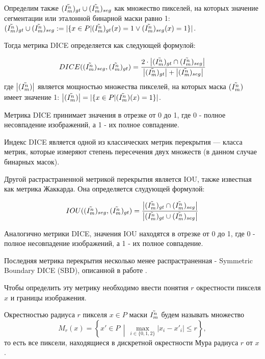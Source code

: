 Определим также \((\tilde{I^n_m})_{gt} \cup (\tilde{I^n_m})_{seg}\) как множество пикселей, на которых значение сегментации или эталонной бинарной маски  равно 1: \((\tilde{I^n_m})_{gt} \cup (\tilde{I^n_m})_{seg} := |\{x \in P | (\tilde{I^n_m})_{gt}(x) = 1 \lor (\tilde{I^n_m})_{seg}(x) = 1 \}|\).

Тогда метрика DICE определяется как следующей формулой:

\begin{equation}\label{eq:DICE}
    DICE((\tilde{I^n_m})_{seg}, (\tilde{I^n_m})_{gt}) =
    \frac{2 \cdot \left|(\tilde{I^n_m})_{gt} \cap (\tilde{I^n_m})_{seg}\right|}
         {\left|(\tilde{I^n_m})_{gt}\right| + \left|(\tilde{I^n_m})_{seg}\right|}
\end{equation}
где \(\left|(\tilde{I^n_m})\right|\) является мощностью множества пикселей, на которых  маска \((\tilde{I^n_m})\) имеет значение 1: \(\left|(\tilde{I^n_m})\right| = |\{x \in P | (\tilde{I^n_m})(x) = 1 \}|\).

Метрика DICE принимает значения в отрезке от 0 до 1, где 0 - полное несовпадение изображений, а 1 - их полное совпадение.

Индекс DICE является одной из классических метрик перекрытия — класса метрик, которые измеряют степень пересечения двух множеств (в данном случае бинарных масок). 

Другой растрастраненной метрикой перекрытия является IOU, также известная как метрика Жаккарда. Она определяется слудующей формулой:

\begin{equation}\label{eq:IOU}
    IOU((\tilde{I^n_m})_{seg}, (\tilde{I^n_m})_{gt}) =
    \frac{\left|(\tilde{I^n_m})_{gt} \cap (\tilde{I^n_m})_{seg}\right|}
         {\left|(\tilde{I^n_m})_{gt} \cup (\tilde{I^n_m})_{seg}\right|}
\end{equation}

Аналогично метрики DICE, значения IOU находятся в отрезке от 0 до 1, где 0 - полное несовпадение изображений, а 1 - их полное совпадение.

Последняя метрика перекрытия несколько менее распрастраненная - Symmetric Boundary DICE (SBD), описанной в работе \cite{yeghiazaryan2018family}.

Чтобы определить эту метрику необходимо ввести понятия \(r\) окрестности пикселя \(x\) и границы изображения.

Окрестностью радиуса \(r\) пикселя \(x \in P\) маски \(\tilde{I^n_m}\) будем называть множество
\begin{equation}\label{eq:neighborhood}
    M_r(x) = \left\{ x' \in P \,\middle|\, \max_{i \in \{0,1,2\}} |x_i - x'_i| \leq r \right\},
\end{equation}
то есть все пиксели, находящиеся в дискретной окрестности Мура радиуса \(r\) от \(x\).

